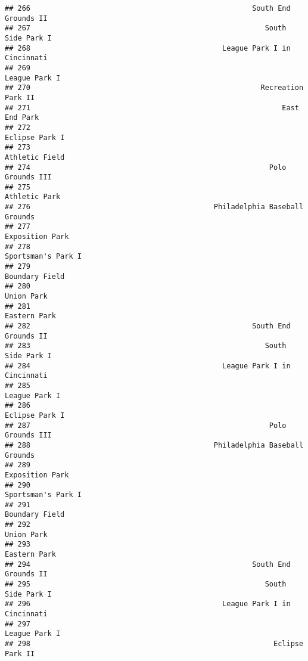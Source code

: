\documentclass[]{article}
\begin{document}
\begin{verbatim}
## 266                                                    South End Grounds II
## 267                                                       South Side Park I
## 268                                             League Park I in Cincinnati
## 269                                                           League Park I
## 270                                                      Recreation Park II
## 271                                                           East End Park
## 272                                                          Eclipse Park I
## 273                                                          Athletic Field
## 274                                                        Polo Grounds III
## 275                                                           Athletic Park
## 276                                           Philadelphia Baseball Grounds
## 277                                                         Exposition Park
## 278                                                      Sportsman's Park I
## 279                                                          Boundary Field
## 280                                                              Union Park
## 281                                                            Eastern Park
## 282                                                    South End Grounds II
## 283                                                       South Side Park I
## 284                                             League Park I in Cincinnati
## 285                                                           League Park I
## 286                                                          Eclipse Park I
## 287                                                        Polo Grounds III
## 288                                           Philadelphia Baseball Grounds
## 289                                                         Exposition Park
## 290                                                      Sportsman's Park I
## 291                                                          Boundary Field
## 292                                                              Union Park
## 293                                                            Eastern Park
## 294                                                    South End Grounds II
## 295                                                       South Side Park I
## 296                                             League Park I in Cincinnati
## 297                                                           League Park I
## 298                                                         Eclipse Park II

\end{verbatim}
\end{document}
